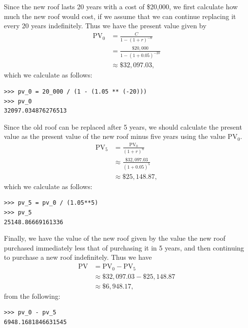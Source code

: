 Since the new roof lasts 20 years with a cost of \$20,000, we first calculate
how much the new roof would cost, if we assume that we can continue replacing
it every 20 years indefinitely. Thus we have the present value given by
\begin{equation*}
    \begin{split}
        \text{PV}_0 &= \frac{C}{1 - {(1 + r)}^{-n}} \\
        &= \frac{\$20,000}{1 - {(1 + 0.05)}^{-20}} \\
        &\approx \$32,097.03,
    \end{split}
\end{equation*}
which we calculate as follows:
\begin{lstlisting}
>>> pv_0 = 20_000 / (1 - (1.05 ** (-20)))
>>> pv_0
32097.034876276513
\end{lstlisting}

Since the old roof can be replaced after 5 years, we should calculate the
present value as the present value of the new roof minus five years using the
value $\text{PV}_0$.
\begin{equation*}
    \begin{split}
        \text{PV}_5 &= \frac{\text{PV}_0}{{(1 + r)}^n} \\
        &\approx \frac{\$32,097.03}{{(1 + 0.05)}^{5}} \\
        &\approx \$25,148.87,
    \end{split}
\end{equation*}
which we calculate as follows:
\begin{lstlisting}
>>> pv_5 = pv_0 / (1.05**5)
>>> pv_5
25148.86669161336
\end{lstlisting}

Finally, we have the value of the new roof given by the value the new roof
purchased immediately less that of purchasing it in 5 years, and then
continuing to purchase a new roof indefinitely. Thus we have
\begin{equation*}
    \begin{split}
        \text{PV} &= \text{PV}_0 - \text{PV}_5 \\
        &\approx \$32,097.03 - \$25,148.87 \\
        &\approx \$6,948.17,
    \end{split}
\end{equation*}
from the following:
\begin{lstlisting}
>>> pv_0 - pv_5
6948.1681846631545
\end{lstlisting}
